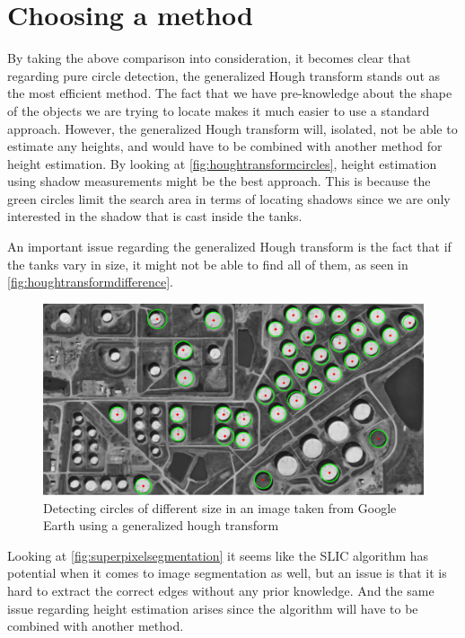 \section{Choosing a method}
By taking the above comparison into consideration, it becomes clear that regarding pure circle detection, the generalized Hough transform stands out as the most efficient method. The fact that we have pre-knowledge about the shape of the objects we are trying to locate makes it much easier to use a standard approach. However, the generalized Hough transform will, isolated, not be able to estimate any heights, and would have to be combined with another method for height estimation. By looking at \autoref{fig:houghtransformcircles}, height estimation using shadow measurements might be the best approach. This is because the green circles limit the search area in terms of locating shadows since we are only interested in the shadow that is cast inside the tanks.

An important issue regarding the generalized Hough transform is the fact that if the tanks vary in size, it might not be able to find all of them, as seen in \autoref{fig:houghtransformdifference}.

\begin{figure}[!h]
	\centering
	\includegraphics[scale=0.35]{fig/hough_transform_difference.png}
	\caption{Detecting circles of different size in an image taken from Google Earth using a generalized hough transform}
	\label{fig:houghtransformdifference}
\end{figure}

Looking at \autoref{fig:superpixelsegmentation} it seems like the SLIC algorithm has potential when it comes to image segmentation as well, but an issue is that it is hard to extract the correct edges without any prior knowledge. And the same issue regarding height estimation arises since the algorithm will have to be combined with another method.

